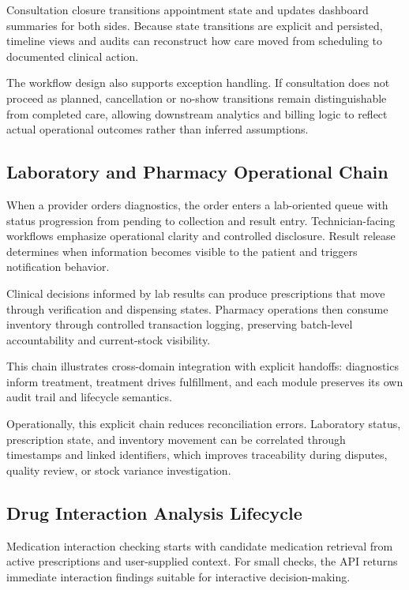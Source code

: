 Consultation closure transitions appointment state and updates dashboard summaries for both sides. Because state transitions are explicit and persisted, timeline views and audits can reconstruct how care moved from scheduling to documented clinical action.

The workflow design also supports exception handling. If consultation does not proceed as planned, cancellation or no-show transitions remain distinguishable from completed care, allowing downstream analytics and billing logic to reflect actual operational outcomes rather than inferred assumptions.

\subsection{Laboratory and Pharmacy Operational Chain}\label{5163-laboratory-and-pharmacy-operational-chain}

When a provider orders diagnostics, the order enters a lab-oriented queue with status progression from pending to collection and result entry. Technician-facing workflows emphasize operational clarity and controlled disclosure. Result release determines when information becomes visible to the patient and triggers notification behavior.

Clinical decisions informed by lab results can produce prescriptions that move through verification and dispensing states. Pharmacy operations then consume inventory through controlled transaction logging, preserving batch-level accountability and current-stock visibility.

This chain illustrates cross-domain integration with explicit handoffs: diagnostics inform treatment, treatment drives fulfillment, and each module preserves its own audit trail and lifecycle semantics.

Operationally, this explicit chain reduces reconciliation errors. Laboratory status, prescription state, and inventory movement can be correlated through timestamps and linked identifiers, which improves traceability during disputes, quality review, or stock variance investigation.

\subsection{Drug Interaction Analysis Lifecycle}\label{5164-drug-interaction-analysis-lifecycle}

Medication interaction checking starts with candidate medication retrieval from active prescriptions and user-supplied context. For small checks, the API returns immediate interaction findings suitable for interactive decision-making.

